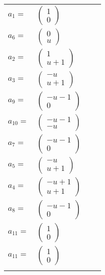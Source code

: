 \documentclass[1p]{elsarticle_modified}
\theoremstyle{definition}
\begin{document}
\begin{tabular}{m{7pt} m{180pt} m{7pt} m{180pt} }
\flushright $a_{1}=$&$\begin{pmatrix}1\\0\end{pmatrix}$ \\
\flushright $a_{6}=$&$\begin{pmatrix}0\\u\end{pmatrix}$ \\
\flushright $a_{2}=$&$\begin{pmatrix}1\\u+1\end{pmatrix}$ \\
\flushright $a_{3}=$&$\begin{pmatrix}- u\\u+1\end{pmatrix}$ \\
\flushright $a_{9}=$&$\begin{pmatrix}- u-1\\0\end{pmatrix}$ \\
\flushright $a_{10}=$&$\begin{pmatrix}- u-1\\- u\end{pmatrix}$ \\
\flushright $a_{7}=$&$\begin{pmatrix}- u-1\\0\end{pmatrix}$ \\
\flushright $a_{5}=$&$\begin{pmatrix}- u\\u+1\end{pmatrix}$ \\
\flushright $a_{4}=$&$\begin{pmatrix}- u+1\\u+1\end{pmatrix}$ \\
\flushright $a_{8}=$&$\begin{pmatrix}- u-1\\0\end{pmatrix}$ \\
\flushright $a_{11}=$&$\begin{pmatrix}1\\0\end{pmatrix}$\\ \flushright $a_{11}=$&$\begin{pmatrix}1\\0\end{pmatrix}$\\&\end{tabular}
\end{document}
